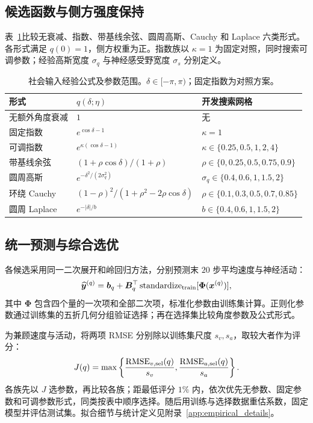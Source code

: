 \documentclass[UTF8,fontset=windows,11pt]{ctexart}
\begin{document}
\subsection{候选函数与侧方强度保持}
表~\ref{tab:empirical_forms}比较无衰减、指数、带基线余弦、圆周高斯、Cauchy 和 Laplace 六类形式。各形式满足 $q(0)=1$，侧方权重为正。指数族以 $\kappa=1$ 为固定对照，同时搜索可调参数；经验高斯宽度 $\sigma_q$ 与神经感受野宽度 $\sigma_s$ 分别定义。
\begin{table}[!tbp]
\centering\small
\caption{社会输入经验公式及参数范围。$\delta\in[-\pi,\pi)$；固定指数为对照方案。}
\label{tab:empirical_forms}
\begin{tabular}{lll}
\toprule
形式 & $q(\delta;\eta)$ & 开发搜索网格\\
\midrule
无额外角度衰减 & $1$ & 无\\
固定指数 & $e^{\cos\delta-1}$ & $\kappa=1$\\
可调指数 & $e^{\kappa(\cos\delta-1)}$ & $\kappa\in\{0.25,0.5,1,2,4\}$\\
带基线余弦 & $(1+\rho\cos\delta)/(1+\rho)$ & $\rho\in\{0,0.25,0.5,0.75,0.9\}$\\
圆周高斯 & $e^{-\delta^2/(2\sigma_q^2)}$ & $\sigma_q\in\{0.4,0.6,1,1.5,2\}$\\
环绕 Cauchy & $(1-\rho)^2/(1+\rho^2-2\rho\cos\delta)$ & $\rho\in\{0.1,0.3,0.5,0.7,0.85\}$\\
圆周 Laplace & $e^{-|\delta|/b}$ & $b\in\{0.4,0.6,1,1.5,2\}$\\
\bottomrule
\end{tabular}
\end{table}


\subsection{统一预测与综合选优}
各候选采用同一二次展开和岭回归方法，分别预测末 $20$ 步平均速度与神经活动：
\begin{equation}
 \widehat{\boldsymbol y}^{(q)}=\boldsymbol b_q+\boldsymbol B_q^\top
 \operatorname{standardize}_{\rm train}[\boldsymbol\Phi(\boldsymbol x^{(q)})],
 \label{eq:empirical_readout}
\end{equation}
其中 $\boldsymbol\Phi$ 包含四个量的一次项和全部二次项，标准化参数由训练集计算。正则化参数通过训练集的五折几何分组验证选择；再在选择集比较角度参数及公式形式。

为兼顾速度与活动，将两项 RMSE 分别除以训练集尺度 $s_v,s_a$，取较大者作为评分：
\begin{equation}
 J(q)=\max\left\{\frac{\operatorname{RMSE}_{v,\rm sel}(q)}{s_v},
 \frac{\operatorname{RMSE}_{a,\rm sel}(q)}{s_a}\right\}.
 \label{eq:empirical_selection_score}
\end{equation}
各族先以 $J$ 选参数，再比较各族；距最低评分 $1\%$ 内，依次优先无参数、固定参数和可调参数形式，同类按表中顺序选择。随后用训练与选择数据重估系数，固定模型并评估测试集。拟合细节与统计定义见附录~\ref{app:empirical_details}。
\end{document}
